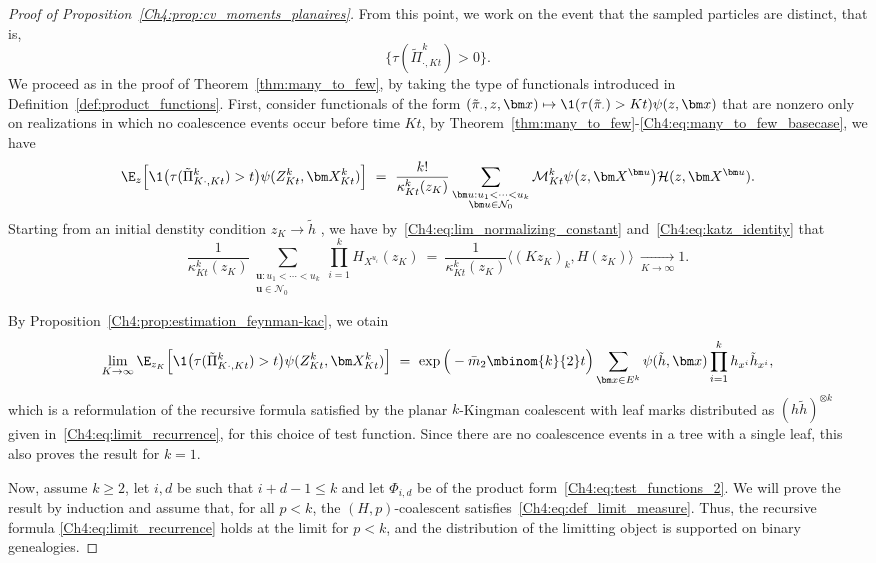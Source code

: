 \begin{refsegment}
\begin{proof}[Proof of Proposition~\ref{Ch4:prop:cv_moments_planaires}]
From this point, we work on the event that the sampled particles are distinct, that is, 
\[
\big\{\tau(\tilde{\Pi}^k_{\cdot,Kt}) > 0\big\}.
\] 
We proceed as in the proof of Theorem~\ref{thm:many_to_few}, by taking the type of functionals introduced in Definition~\ref{def:product_functions}. 
   First, consider functionals of the form $(\tilde{\pi}_{\cdot}, z,\bm x)\mapsto \1(\tau(\tilde\pi_\cdot) > Kt)\psi( z,  \bm x)$ that are nonzero only on realizations in which no coalescence events
occur before time $Kt$, by Theorem~\ref{thm:many_to_few}-\eqref{Ch4:eq:many_to_few_basecase}, we have
\[
    \E_{z}\Big[\1\big(\tau(\tilde\Pi^k_{K\cdot,Kt}) > t\big)\psi( Z^k_{Kt},  \bm X^k_{Kt})\Big]\ = \
    \frac{k!}{\kappa^{k}_{Kt}(z_K)}\sum_{\substack{\bm u : u_1<\cdots<u_k\\ \bm u\in \mathcal N_0}} \mathcal{M}^k_{Kt}{\psi}\big(z, \bm X^{\bm u}\big)\mathcal H( z,\bm X^{\bm u}).
\]
Starting from an initial denstity condition $ z_K\to \tilde h$ , we have by~\eqref{Ch4:eq:lim_normalizing_constant} and~\eqref{Ch4:eq:katz_identity} that
\[
\frac{1}{\kappa^{k}_{Kt}(z_K)}\sum_{\substack{\bm u: u_1<\cdots<u_k\\ \bm u \in\mathcal{N}_0}} \prod_{i=1}^k H_{X^{u_i}}(z_K)\ = \ \frac{1}{\kappa^{k}_{Kt}(z_K)}\big\langle (Kz_K)_k, H( z_K)\big\rangle\ \underset{K\to\infty}{\longrightarrow} 1.
\] 

By Proposition~\ref{Ch4:prop:estimation_feynman-kac}, we otain
\begin{equation} \label{Ch4:eq:limit_base_case}
    \lim_{K \to \infty} \E_{z_K}\Big[\1\big(\tau(\tilde\Pi^k_{K\cdot,Kt}) > t\big)\psi( Z^k_{Kt},  \bm X^k_{Kt})\Big]
  \  =\  \exp\Big(-\bar m_2\mbinom{k}{2}t\Big)\sum_{\bm x\in E^k}\psi(\tilde h, \bm x)\prod_{i=1}^k h_{x^i}\tilde h_{x^i},
\end{equation}
which is a reformulation of the recursive formula satisfied by the planar $k$-Kingman coalescent with leaf marks distributed as $(h\tilde h)^{\otimes k}$ given in~\eqref{Ch4:eq:limit_recurrence}, for this choice of test function. Since there are
no coalescence events in a tree with a single leaf, this also proves the
result for $k=1$.


Now, assume $k\geq 2$, let $i,d$ be such that $i+ d-1\leq k$ and let $\Phi_{i,d}$ be of the product form~\eqref{Ch4:eq:test_functions_2}.
We will prove the result by induction and assume that, for all $p < k$, the $(H,p)$-coalescent satisfies~\eqref{Ch4:eq:def_limit_measure}. Thus,
the recursive formula
\eqref{Ch4:eq:limit_recurrence} holds at the limit for $p<k$, and the distribution of the limitting object is supported on binary genealogies.


\end{proof}
\end{refsegment}
